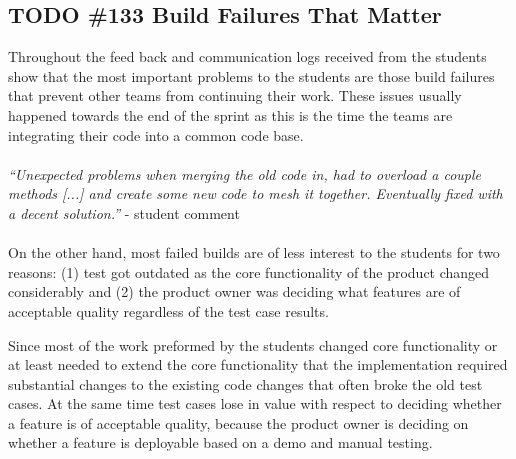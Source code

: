 \subsection{TODO \#133 Build Failures That Matter}
Throughout the feed back and communication logs received from the students show that the most important problems to the students are those build failures that prevent other teams from continuing their work.
These issues usually happened towards the end of the sprint as this is the time the teams are integrating their code into a common code base.
\\ \ \\
\indent\emph{``Unexpected problems when merging the old code in, had to overload a couple methods [...]  and create some new code to mesh it together.  Eventually fixed with a decent solution.''} - student comment
\\ \ \\
\indent On the other hand, most failed builds are of less interest to the students for two reasons: 
(1) test got outdated as the core functionality of the product changed considerably 
and (2) the product owner was deciding what features are of acceptable quality regardless of the test case results.

Since most of the work preformed by the students changed core functionality or at least needed to extend the core functionality that the implementation required substantial changes to the existing code changes that often broke the old test cases.
At the same time test cases lose in value with respect to deciding whether a feature is of acceptable quality, because the product owner is deciding on whether a feature is deployable based on a demo and manual testing.

